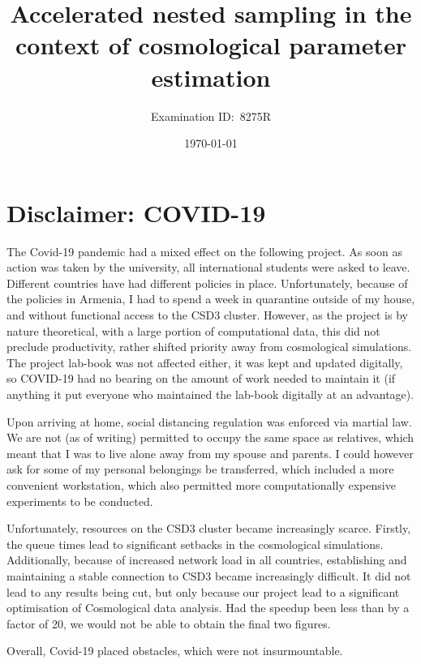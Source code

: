 \documentclass[usenatbib]{mnras}
\author[8275R]{Examination ID:~8275R}
\date{\today}
\title[Accelerated Nested Sampling]{Accelerated nested sampling in the context of cosmological parameter estimation}
\begin{document}
\newpage
\thispagestyle{plain} %
\section*{Disclaimer: COVID-19}
The Covid-19 pandemic had a mixed effect on the following project. As
soon as action was taken by the university, all international students
were asked to leave. Different countries have had different policies
in place. Unfortunately, because of the policies in Armenia, I had to
spend a week in quarantine outside of my house, and without functional
access to the CSD3 cluster. However, as the project is by nature
theoretical, with a large portion of computational data, this did not
preclude productivity, rather shifted priority away from cosmological
simulations. The project lab-book was not affected either, it was kept
and updated digitally, so COVID-19 had no bearing on the amount of
work needed to maintain it (if anything it put everyone who maintained
the lab-book digitally at an advantage).

Upon arriving at home, social distancing regulation was enforced via
martial law. We are not (as of writing) permitted to occupy the same
space as relatives, which meant that I was to live alone away from my
spouse and parents. I could however ask for some of my personal
belongings be transferred, which included a more convenient
workstation, which also permitted more computationally expensive
experiments to be conducted.

Unfortunately, resources on the CSD3 cluster became increasingly
scarce. Firstly, the queue times lead to significant setbacks in the
cosmological simulations. Additionally, because of increased network
load in all countries, establishing and maintaining a stable connection
to CSD3 became increasingly difficult. It did not lead to any results
being cut, but only because our project lead to a significant
optimisation of Cosmological data analysis. Had the speedup been less
than by a factor of 20, we would not be able to obtain the final two
figures.

Overall, Covid-19 placed obstacles, which were not insurmountable. 

\mbox{}
\end{document}
